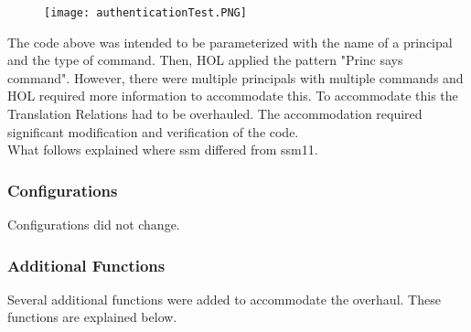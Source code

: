 \begin{figure}[h]
  \centering
  \texttt{[image: authenticationTest.PNG]}
\end{figure}

The code above was intended to be parameterized with the name of a principal and the type of command.  Then, HOL applied the pattern "Princ says command".  However, there were multiple principals with multiple commands and HOL required more information to accommodate this.  To accommodate this the Translation Relations had to be overhauled.  The accommodation required significant modification and verification of the code.  \\
  
  What follows explained where ssm differed from ssm11.

\subsubsection{Configurations}
\label{sec:configurations-2}

  Configurations did not change.

\subsubsection{Additional Functions}
\label{sec:additional-functions}

   Several additional functions were added to accommodate the overhaul. These functions are explained below.\\


